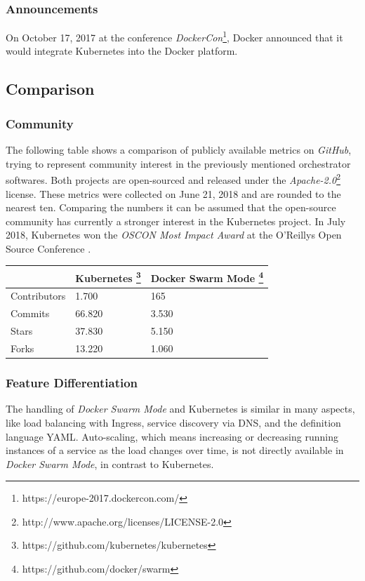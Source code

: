 \subsubsection{Announcements}\label{announcements}

On October 17, 2017 at the conference \emph{DockerCon}\footnote{https://europe-2017.dockercon.com/},
Docker announced that it would integrate Kubernetes into the Docker
platform.

\subsection{Comparison}\label{comparison}

\subsubsection{Community}\label{community}

The following table shows a comparison of publicly available metrics on
\emph{GitHub}, trying to represent community interest in the previously
mentioned orchestrator softwares. Both projects are open-sourced and
released under the \emph{Apache-2.0}\footnote{http://www.apache.org/licenses/LICENSE-2.0}
license. These metrics were collected on June 21, 2018 and are rounded
to the nearest ten. Comparing the numbers it can be assumed that the
open-source community has currently a stronger interest in the
Kubernetes project. In July 2018, Kubernetes won the \emph{OSCON Most
Impact Award} at the O'Reillys Open Source Conference
\cite{heise-oscon}.

\begin{longtable}[]{@{}lll@{}}
\toprule
& Kubernetes \footnote{https://github.com/kubernetes/kubernetes} &
Docker Swarm Mode \footnote{https://github.com/docker/swarm}\tabularnewline
\midrule
\endhead
Contributors & 1.700 & 165\tabularnewline
Commits & 66.820 & 3.530\tabularnewline
Stars & 37.830 & 5.150\tabularnewline
Forks & 13.220 & 1.060\tabularnewline
\bottomrule
\end{longtable}

\subsubsection{Feature Differentiation}\label{feature-differentiation}

The handling of \emph{Docker Swarm Mode} and Kubernetes is similar in
many aspects, like load balancing with Ingress, service discovery via
DNS, and the definition language YAML. Auto-scaling, which means
increasing or decreasing running instances of a service as the load
changes over time, is not directly available in \emph{Docker Swarm
Mode}, in contrast to Kubernetes.

